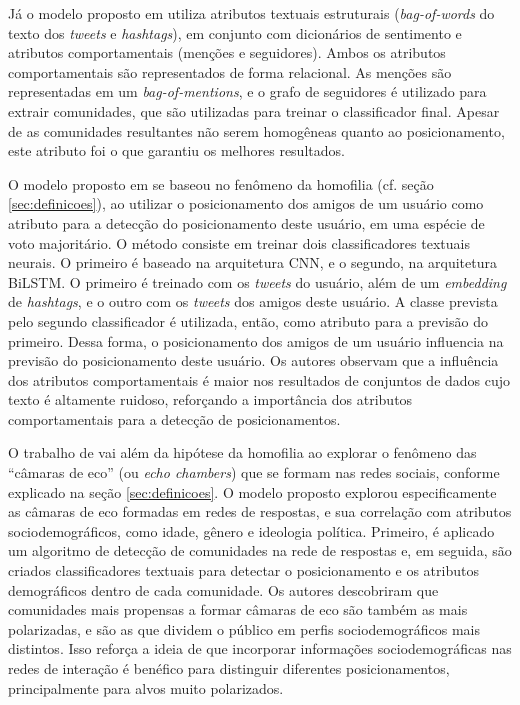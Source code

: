 \documentclass[
	12pt, oneside, a4paper, english, brazil
]{abntex2ppgsi}
\begin{document}
Já o modelo proposto em  utiliza atributos textuais estruturais ({\em bag-of-words} do texto dos {\em tweets} e {\em hashtags}), em conjunto com dicionários de sentimento e atributos comportamentais (menções e seguidores). Ambos os atributos comportamentais são representados de forma relacional. As menções são representadas em um {\em bag-of-mentions}, e o grafo de seguidores é utilizado para extrair comunidades, que são utilizadas para treinar o classificador final. Apesar de as comunidades resultantes não serem homogêneas quanto ao posicionamento, este atributo foi o que garantiu os melhores resultados.

O modelo proposto em  se baseou no fenômeno da homofilia (cf. seção \ref{sec:definicoes}), ao utilizar o posicionamento dos amigos de um usuário como atributo para a detecção do posicionamento deste usuário, em uma espécie de voto majoritário. O método consiste em treinar dois classificadores textuais neurais. O primeiro é baseado na arquitetura CNN, e o segundo, na arquitetura BiLSTM. O primeiro é treinado com os {\em tweets} do usuário, além de um {\em embedding} de {\em hashtags}, e o outro com os {\em tweets} dos amigos deste usuário. A classe prevista pelo segundo classificador é utilizada, então, como atributo para a previsão do primeiro. Dessa forma, o posicionamento dos amigos de um usuário influencia na previsão do posicionamento deste usuário. Os autores observam que a influência dos atributos comportamentais é maior nos resultados de conjuntos de dados cujo texto é altamente ruidoso, reforçando a importância dos atributos comportamentais para a detecção de posicionamentos.

O trabalho de  vai além da hipótese da homofilia ao explorar o fenômeno das ``câmaras de eco'' (ou {\em echo chambers}) que se formam nas redes sociais, conforme explicado na seção \ref{sec:definicoes}. O modelo proposto explorou especificamente as câmaras de eco formadas em redes de respostas, e sua correlação com atributos sociodemográficos, como idade, gênero e ideologia política. Primeiro, é aplicado um algoritmo de detecção de comunidades na rede de respostas e, em seguida, são criados classificadores textuais para detectar o posicionamento e os atributos demográficos dentro de cada comunidade. Os autores descobriram que comunidades mais propensas a formar câmaras de eco são também as mais polarizadas, e são as que dividem o público em perfis sociodemográficos mais distintos. Isso reforça a ideia de que incorporar informações sociodemográficas nas redes de interação é benéfico para distinguir diferentes posicionamentos, principalmente para alvos muito polarizados.
\end{document}
